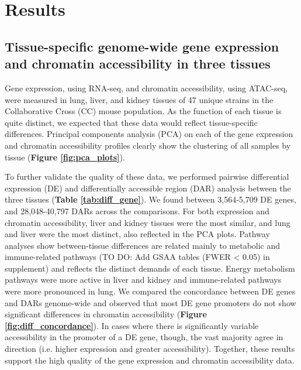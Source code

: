 \section{Results}

\subsection{Tissue-specific genome-wide gene expression and chromatin accessibility in three tissues}

Gene expression, using RNA-seq, and chromatin accessibility, using ATAC-seq, were measured in lung, liver, and kidney tissues of 47 unique strains in the Collaborative Cross (CC) mouse population. As the function of each tissue is quite distinct, we expected that these data would reflect tissue-specific differences. Principal components analysis (PCA) on each of the gene expression and chromatin accessibility profiles clearly show the clustering of all samples by tissue (\textbf{Figure \ref{fig:pca_plots}}). 

To further validate the quality of these data, we performed pairwise differential expression (DE) and differentially accessible region (DAR) analysis between the three tissues (\textbf{Table \ref{tab:diff_gene}}). We found between 3,564-5,709 DE genes, and 28,048-40,797 DARs across the comparisons. For both expression and chromatin accessibility, liver and kidney tissues were the most similar, and lung and liver were the most distinct, also reflected in the PCA plots. Pathway analyses show between-tissue differences are related mainly to metabolic and immune-related pathways (TO DO: Add GSAA tables (FWER < 0.05) in supplement) and reflects the distinct demands of each tissue. Energy metabolism pathways were more active in liver and kidney and immune-related pathways were more pronounced in lung. We compared the concordance between DE genes and DARs genome-wide and observed that most DE gene promoters do not show significant differences in chromatin accessibility (\textbf{Figure \ref{fig:diff_concordance}}). In cases where there is significantly variable accessibility in the promoter of a DE gene, though, the vast majority agree in direction (i.e. higher expression and greater accessibility). Together, these results support the high quality of the gene expression and chromatin accessibility data.

